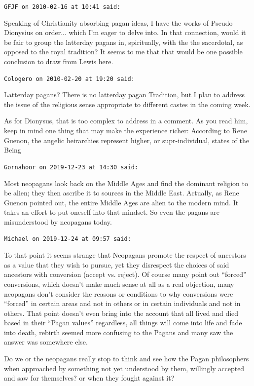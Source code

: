 \begin{footnotesize}
\begin{sffamily}
\hfill

\texttt{GFJF on 2010-02-16 at 10:41 said:}

Speaking of Christianity absorbing pagan ideas, I have the works of Pseudo Dionysius on order... which I'm eager to delve into. In that connection, would it be fair to group the latterday pagans in, spiritually, with the the sacerdotal, as opposed to the royal tradition? It seems to me that that would be one possible conclusion to draw from Lewis here.

\hfill

\texttt{Cologero on 2010-02-20 at 19:20 said:}

Latterday pagans? There is no latterday pagan Tradition, but I plan to address the issue of the religious sense appropriate to different castes in the coming week.

As for Dionysus, that is too complex to address in a comment. As you read him, keep in mind one thing that may make the experience richer: According to Rene Guenon, the angelic heirarchies represent higher, or supr-individual, states of the Being

\hfill

\texttt{Gornahoor on 2019-12-23 at 14:30 said:}

Most neopagans look back on the Middle Ages and find the dominant religion to be alien; they then ascribe it to sources in the Middle East. Actually, as Rene Guenon pointed out, the entire Middle Ages are alien to the modern mind. It takes an effort to put oneself into that mindset. So even the pagans are misunderstood by neopagans today.

\hfill

\texttt{Michael on 2019-12-24 at 09:57 said:}

To that point it seems strange that Neopagans promote the respect of ancestors as a value that they wish to pursue, yet they disrespect the choices of said ancestors with conversion (accept vs. reject). Of course many point out ``forced'' conversions, which doesn't make much sense at all as a real objection, many neopagans don't consider the reasons or conditions to why conversions were ``forced'' in certain areas and not in others or in certain individuals and not in others. That point doesn't even bring into the account that all lived and died based in their ``Pagan values'' regardless, all things will come into life and fade into death, rebirth seemed more confusing to the Pagans and many saw the answer was somewhere else.

Do we or the neopagans really stop to think and see how the Pagan philosophers when approached by something not yet understood by them, willingly accepted and saw for themselves? or when they fought against it?


\end{sffamily}
\end{footnotesize}
